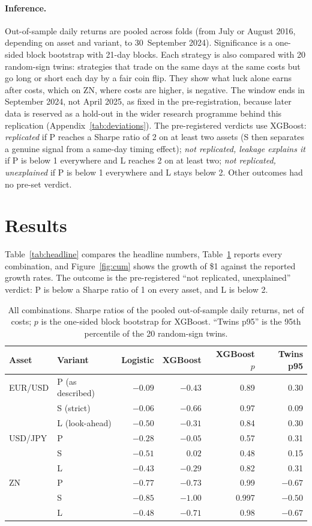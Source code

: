 \documentclass[11pt]{article}
\begin{document}
\paragraph{Inference.} Out-of-sample daily returns are pooled across folds (from July or August 2016, depending on
asset and variant, to 30~September 2024). Significance is a one-sided block bootstrap with 21-day blocks. Each
strategy is also compared with 20 random-sign twins: strategies that trade on the same days at the same costs but go
long or short each day by a fair coin flip. They show what luck alone earns after costs, which on ZN, where costs
are higher, is negative. The window ends in
September 2024, not April 2025, as fixed in the pre-registration, because later data is reserved as a hold-out in the
wider research programme behind this replication (Appendix~\ref{tab:deviations}). The pre-registered verdicts use XGBoost: \emph{replicated} if P
reaches a Sharpe ratio of 2 on at least two assets (S then separates a genuine signal from a same-day
timing effect); \emph{not replicated, leakage explains it} if P is below 1 everywhere and L reaches 2 on at least
two; \emph{not replicated, unexplained} if P is below 1 everywhere and L stays below 2. Other outcomes had no pre-set
verdict.

\section{Results}
Table~\ref{tab:headline} compares the headline numbers, Table~\ref{tab:all} reports every combination, and
Figure~\ref{fig:cum} shows the growth of \$1 against the reported growth rates.
The outcome is the pre-registered ``not replicated, unexplained'' verdict: P is below a Sharpe ratio of 1 on every
asset, and L is below 2.

\begin{table}[t]\centering
\caption{All combinations. Sharpe ratios of the pooled out-of-sample daily returns, net of costs; $p$ is the
one-sided block bootstrap for XGBoost. ``Twins p95'' is the 95th percentile of the 20 random-sign twins.}
\label{tab:all}
\begin{tabular}{llrrrr}\toprule
Asset & Variant & Logistic & XGBoost & XGBoost $p$ & Twins p95\\\midrule
EUR/USD & P (as described) & $-0.09$ & $-0.43$ & 0.89 & 0.30\\
        & S (strict)       & $-0.06$ & $-0.66$ & 0.97 & 0.09\\
        & L (look-ahead)   & $-0.50$ & $-0.31$ & 0.84 & 0.30\\
USD/JPY & P & $-0.28$ & $-0.05$ & 0.57 & 0.31\\
        & S & $-0.51$ & $0.02$  & 0.48 & 0.15\\
        & L & $-0.43$ & $-0.29$ & 0.82 & 0.31\\
ZN      & P & $-0.77$ & $-0.73$ & 0.99 & $-0.67$\\
        & S & $-0.85$ & $-1.00$ & 0.997 & $-0.50$\\
        & L & $-0.48$ & $-0.71$ & 0.98 & $-0.67$\\\bottomrule
\end{tabular}
\end{table}
\end{document}
